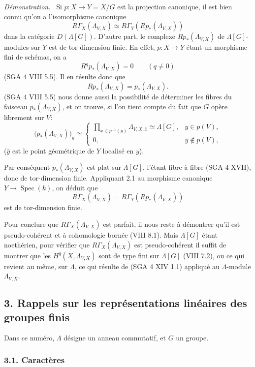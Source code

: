 \documentclass[11pt]{article}
\newenvironment{prooftext}[1][Proof]{\par\noindent\emph{#1.}\ }{\par\medskip}
\DeclareMathOperator{\Spec}{Spec}
\providecommand{\Spec}{\operatorname{Spec}}
\providecommand{\Spec}{\operatorname{Spec}}
\begin{document}
\begin{prooftext}[Démonstration]
Si $p:X\to Y=X/G$ est la projection canonique, il est bien connu qu'on a l'isomorphisme canonique
\[
R\Gamma_X(\Lambda_{V,X})\simeq R\Gamma_Y(Rp_*(\Lambda_{V,X}))
\]
dans la catégorie $D(\Lambda[G])$. D'autre part, le complexe $Rp_*(\Lambda_{V,X})$ de $\Lambda[G]$-modules sur $Y$ est de tor-dimension finie. En effet, $p:X\to Y$ étant un morphisme fini de schémas, on a
\[
R^q p_*(\Lambda_{V,X})=0\qquad(q\ne0)
\]
(SGA 4 VIII 5.5). Il en résulte donc que
\[
Rp_*(\Lambda_{V,X})=p_*(\Lambda_{V,X}).
\]
(SGA 4 VIII 5.5) nous donne aussi la possibilité de déterminer les fibres du faisceau $p_*(\Lambda_{V,X})$, et on trouve, si l'on tient compte du fait que $G$ opère librement sur $V$:
\[
\bigl(p_*(\Lambda_{V,X})\bigr)_{\bar y}\simeq
\begin{cases}
\displaystyle \prod_{x\in p^{-1}(y)}\Lambda_{V,X,\bar x}\simeq \Lambda[G],& y\in p(V),\\[1em]
0,& y\notin p(V),
\end{cases}
\]
($\bar y$ est le point géométrique de $Y$ localisé en $y$).

Par conséquent $p_*(\Lambda_{V,X})$ est plat sur $\Lambda[G]$, l'étant fibre à fibre (SGA 4 XVII), donc de tor-dimension finie. Appliquant 2.1 au morphisme canonique $Y\to\Spec(k)$, on déduit que
\[
R\Gamma_X(\Lambda_{V,X})=R\Gamma_Y(Rp_*(\Lambda_{V,X}))
\]
est de tor-dimension finie.

Pour conclure que $R\Gamma_X(\Lambda_{V,X})$ est parfait, il nous reste à démontrer qu'il est pseudo-cohérent et à cohomologie bornée (VIII 8.1). Mais $\Lambda[G]$ étant noethérien, pour vérifier que $R\Gamma_X(\Lambda_{V,X})$ est pseudo-cohérent il suffit de montrer que les $H^q(X,\Lambda_{V,X})$ sont de type fini sur $\Lambda[G]$ (VIII 7.2), ou ce qui revient au même, sur $\Lambda$, ce qui résulte de (SGA 4 XIV 1.1) appliqué au $\Lambda$-module $\Lambda_{V,X}$.
\end{prooftext}

\subsection*{3. Rappels sur les représentations linéaires des groupes finis}

Dans ce numéro, $\Lambda$ désigne un anneau commutatif, et $G$ un groupe.

\subsubsection*{3.1. Caractères}
\end{document}

